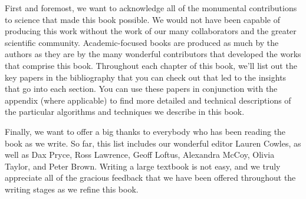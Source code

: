 First and foremost, we want to acknowledge all of the monumental contributions to science that made this book possible. We would not have been capable of producing this work without the work of our many collaborators and the greater scientific community. Academic-focused books are produced as much by the authors as they are by the many wonderful contributors that developed the works that comprise this book. Throughout each chapter of this book, we'll list out the key papers in the bibliography that you can check out that led to the insights that go into each section. You can use these papers in conjunction with the appendix (where applicable) to find more detailed and technical descriptions of the particular algorithms and techniques we describe in this book. 

Finally, we want to offer a big thanks to everybody who has been reading the book as we write. So far, this list includes our wonderful editor Lauren Cowles, as well as Dax Pryce, Ross Lawrence, Geoff Loftus, Alexandra McCoy, Olivia Taylor, and Peter Brown. Writing a large textbook is not easy, and we truly appreciate all of the gracious feedback that we have been offered throughout the writing stages as we refine this book.


